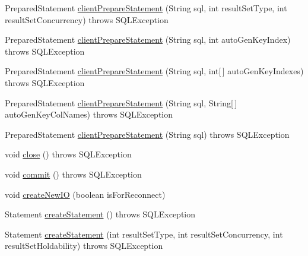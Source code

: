 \begin{DoxyCompactItemize}
\item 
Prepared\+Statement \mbox{\hyperlink{classcom_1_1mysql_1_1cj_1_1jdbc_1_1ha_1_1_multi_host_my_s_q_l_connection_aa2b134c582c04c7016ffa481a25d4e18}{client\+Prepare\+Statement}} (String sql, int result\+Set\+Type, int result\+Set\+Concurrency)  throws S\+Q\+L\+Exception 
\item 
Prepared\+Statement \mbox{\hyperlink{classcom_1_1mysql_1_1cj_1_1jdbc_1_1ha_1_1_multi_host_my_s_q_l_connection_a384dc86ad7784b2b6f87d74e9242e248}{client\+Prepare\+Statement}} (String sql, int auto\+Gen\+Key\+Index)  throws S\+Q\+L\+Exception 
\item 
Prepared\+Statement \mbox{\hyperlink{classcom_1_1mysql_1_1cj_1_1jdbc_1_1ha_1_1_multi_host_my_s_q_l_connection_ac3338beff85b1b1704e87f67b643eeaa}{client\+Prepare\+Statement}} (String sql, int\mbox{[}$\,$\mbox{]} auto\+Gen\+Key\+Indexes)  throws S\+Q\+L\+Exception 
\item 
Prepared\+Statement \mbox{\hyperlink{classcom_1_1mysql_1_1cj_1_1jdbc_1_1ha_1_1_multi_host_my_s_q_l_connection_af7a6412387f62b55132775c5f9700fd9}{client\+Prepare\+Statement}} (String sql, String\mbox{[}$\,$\mbox{]} auto\+Gen\+Key\+Col\+Names)  throws S\+Q\+L\+Exception 
\item 
Prepared\+Statement \mbox{\hyperlink{classcom_1_1mysql_1_1cj_1_1jdbc_1_1ha_1_1_multi_host_my_s_q_l_connection_aad5b9594841a4c935130b225d0c3d686}{client\+Prepare\+Statement}} (String sql)  throws S\+Q\+L\+Exception 
\item 
void \mbox{\hyperlink{classcom_1_1mysql_1_1cj_1_1jdbc_1_1ha_1_1_multi_host_my_s_q_l_connection_a395d1a2ad3c87af7cc97a6a516b601f2}{close}} ()  throws S\+Q\+L\+Exception 
\item 
void \mbox{\hyperlink{classcom_1_1mysql_1_1cj_1_1jdbc_1_1ha_1_1_multi_host_my_s_q_l_connection_a789df6249664b46fe3142bc4d981b046}{commit}} ()  throws S\+Q\+L\+Exception 
\item 
void \mbox{\hyperlink{classcom_1_1mysql_1_1cj_1_1jdbc_1_1ha_1_1_multi_host_my_s_q_l_connection_a82a97ebf4275bab6b1a25ef00985185d}{create\+New\+IO}} (boolean is\+For\+Reconnect)
\item 
Statement \mbox{\hyperlink{classcom_1_1mysql_1_1cj_1_1jdbc_1_1ha_1_1_multi_host_my_s_q_l_connection_a92d29e789b428734a8ea9232b0e45092}{create\+Statement}} ()  throws S\+Q\+L\+Exception 
\item 
Statement \mbox{\hyperlink{classcom_1_1mysql_1_1cj_1_1jdbc_1_1ha_1_1_multi_host_my_s_q_l_connection_a09c85146032934aa5ee3ebfaa48ffd5c}{create\+Statement}} (int result\+Set\+Type, int result\+Set\+Concurrency, int result\+Set\+Holdability)  throws S\+Q\+L\+Exception 

\end{DoxyCompactItemize}
